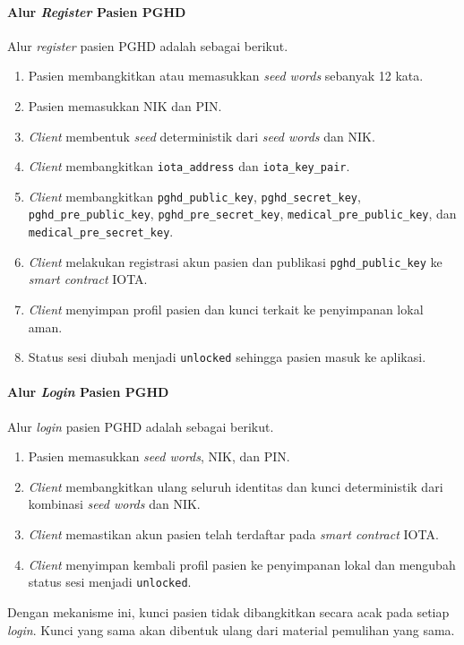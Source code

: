 \paragraph{Alur \textit{Register} Pasien PGHD}

Alur \textit{register} pasien PGHD adalah sebagai berikut.

\begin{enumerate}
    \item Pasien membangkitkan atau memasukkan \textit{seed words} sebanyak 12 kata.
    \item Pasien memasukkan NIK dan PIN\@.
    \item \textit{Client} membentuk \textit{seed} deterministik dari \textit{seed words} dan NIK\@.
    \item \textit{Client} membangkitkan \texttt{iota\_address} dan \texttt{iota\_key\_pair}.
    \item \textit{Client} membangkitkan \texttt{pghd\_public\_key}, \texttt{pghd\_secret\_key}, \texttt{pghd\_pre\_public\_key}, \texttt{pghd\_pre\_secret\_key}, \texttt{medical\_pre\_public\_key}, dan \texttt{medical\_pre\_secret\_key}.
    \item \textit{Client} melakukan registrasi akun pasien dan publikasi \texttt{pghd\_public\_key} ke \textit{smart contract} IOTA\@.
    \item \textit{Client} menyimpan profil pasien dan kunci terkait ke penyimpanan lokal aman.
    \item Status sesi diubah menjadi \texttt{unlocked} sehingga pasien masuk ke aplikasi.
\end{enumerate}


\paragraph{Alur \textit{Login} Pasien PGHD}

Alur \textit{login} pasien PGHD adalah sebagai berikut.

\begin{enumerate}
    \item Pasien memasukkan \textit{seed words}, NIK, dan PIN\@.
    \item \textit{Client} membangkitkan ulang seluruh identitas dan kunci deterministik dari kombinasi \textit{seed words} dan NIK\@.
    \item \textit{Client} memastikan akun pasien telah terdaftar pada \textit{smart contract} IOTA\@.
    \item \textit{Client} menyimpan kembali profil pasien ke penyimpanan lokal dan mengubah status sesi menjadi \texttt{unlocked}.
\end{enumerate}

Dengan mekanisme ini, kunci pasien tidak dibangkitkan secara acak pada setiap \textit{login}. 
Kunci yang sama akan dibentuk ulang dari material pemulihan yang sama.
